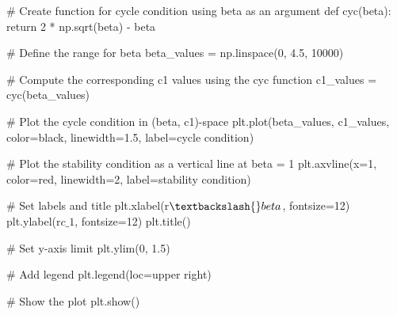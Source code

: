 \documentclass[
  letterpaper,
  DIV=11,
  numbers=noendperiod]{scrreprt}
\newenvironment{Shaded}{\begin{snugshade}}{\end{snugshade}}
\newcommand{\CommentTok}[1]{\textcolor[rgb]{0.37,0.37,0.37}{#1}}
\newcommand{\ControlFlowTok}[1]{\textcolor[rgb]{0.00,0.23,0.31}{#1}}
\newcommand{\DecValTok}[1]{\textcolor[rgb]{0.68,0.00,0.00}{#1}}
\newcommand{\FloatTok}[1]{\textcolor[rgb]{0.68,0.00,0.00}{#1}}
\newcommand{\KeywordTok}[1]{\textcolor[rgb]{0.00,0.23,0.31}{#1}}
\newcommand{\NormalTok}[1]{\textcolor[rgb]{0.00,0.23,0.31}{#1}}
\newcommand{\OperatorTok}[1]{\textcolor[rgb]{0.37,0.37,0.37}{#1}}
\newcommand{\StringTok}[1]{\textcolor[rgb]{0.13,0.47,0.30}{#1}}
\newcommand{\VerbatimStringTok}[1]{\textcolor[rgb]{0.13,0.47,0.30}{#1}}
\begin{document}
\begin{tcolorbox}[enhanced jigsaw, titlerule=0mm, breakable, bottomrule=.15mm, toprule=.15mm, colbacktitle=quarto-callout-note-color!10!white, rightrule=.15mm, toptitle=1mm, opacityback=0, left=2mm, coltitle=black, title=\textcolor{quarto-callout-note-color}{\faInfo}\hspace{0.5em}{Python code}, colframe=quarto-callout-note-color-frame, opacitybacktitle=0.6, leftrule=.75mm, bottomtitle=1mm, arc=.35mm, colback=white]

\begin{Shaded}
\begin{Highlighting}[]
\CommentTok{\# Create function for cycle condition using beta as an argument}
\KeywordTok{def}\NormalTok{ cyc(beta):}
    \ControlFlowTok{return} \DecValTok{2} \OperatorTok{*}\NormalTok{ np.sqrt(beta) }\OperatorTok{{-}}\NormalTok{ beta}

\CommentTok{\# Define the range for beta }
\NormalTok{beta\_values }\OperatorTok{=}\NormalTok{ np.linspace(}\DecValTok{0}\NormalTok{, }\FloatTok{4.5}\NormalTok{, }\DecValTok{10000}\NormalTok{)}

\CommentTok{\# Compute the corresponding c1 values using the cyc function}
\NormalTok{c1\_values }\OperatorTok{=}\NormalTok{ cyc(beta\_values)}

\CommentTok{\# Plot the cycle condition in (beta, c1){-}space}
\NormalTok{plt.plot(beta\_values, c1\_values, color}\OperatorTok{=}\StringTok{\textquotesingle{}black\textquotesingle{}}\NormalTok{, linewidth}\OperatorTok{=}\FloatTok{1.5}\NormalTok{, label}\OperatorTok{=}\StringTok{\textquotesingle{}cycle condition\textquotesingle{}}\NormalTok{)}

\CommentTok{\# Plot the stability condition as a vertical line at beta = 1}
\NormalTok{plt.axvline(x}\OperatorTok{=}\DecValTok{1}\NormalTok{, color}\OperatorTok{=}\StringTok{\textquotesingle{}red\textquotesingle{}}\NormalTok{, linewidth}\OperatorTok{=}\DecValTok{2}\NormalTok{, label}\OperatorTok{=}\StringTok{\textquotesingle{}stability condition\textquotesingle{}}\NormalTok{)}

\CommentTok{\# Set labels and title}
\NormalTok{plt.xlabel(}\VerbatimStringTok{r\textquotesingle{}$\textbackslash{}beta$\textquotesingle{}}\NormalTok{, fontsize}\OperatorTok{=}\DecValTok{12}\NormalTok{)}
\NormalTok{plt.ylabel(}\VerbatimStringTok{r\textquotesingle{}$c\_1$\textquotesingle{}}\NormalTok{, fontsize}\OperatorTok{=}\DecValTok{12}\NormalTok{)}
\NormalTok{plt.title(}\StringTok{\textquotesingle{}\textquotesingle{}}\NormalTok{)}

\CommentTok{\# Set y{-}axis limit }
\NormalTok{plt.ylim(}\DecValTok{0}\NormalTok{, }\FloatTok{1.5}\NormalTok{)}

\CommentTok{\# Add legend}
\NormalTok{plt.legend(loc}\OperatorTok{=}\StringTok{\textquotesingle{}upper right\textquotesingle{}}\NormalTok{)}

\CommentTok{\# Show the plot}
\NormalTok{plt.show()}
\end{Highlighting}
\end{Shaded}

\end{tcolorbox}
\end{document}
